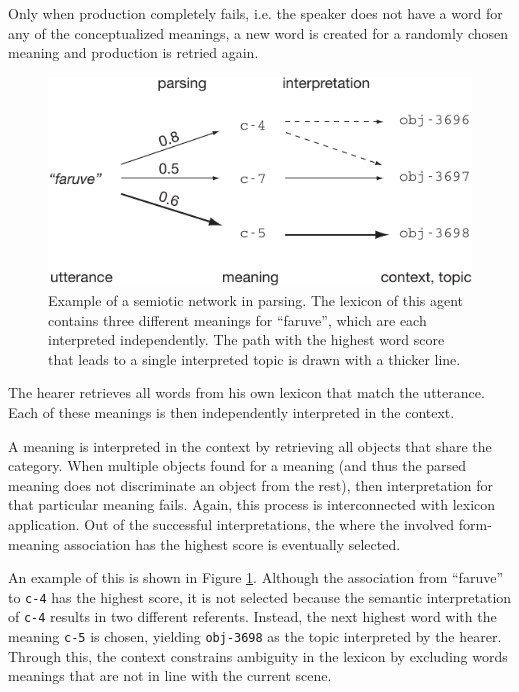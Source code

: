 Only when production completely fails,
i.e. the speaker does not have a word for any of the conceptualized
meanings, a new word is created for a randomly chosen meaning and
production is retried again.

\begin{figure}[t]
  \includegraphics[scale=0.8]{figures/sgg-semiotic-network-parsing}
  \caption{Example of a semiotic network in parsing. The lexicon of
    this agent contains three different meanings for ``faruve'', which
    are each interpreted independently. The path with the highest word
    score that leads to a single interpreted topic is drawn with a
    thicker line. }
  \label{f:sgg-semiotic-network-parsing}
\end{figure}

 The hearer retrieves all words from his own
lexicon that match the utterance. Each of these meanings is then
independently interpreted in the context.

 A meaning
is interpreted in the context by retrieving all objects that share the
category. When multiple objects found for a meaning (and thus the
parsed meaning does not discriminate an object from the rest), then
interpretation for that particular meaning fails. Again, this process
is interconnected with lexicon application. Out of the successful
interpretations, the where the involved form-meaning association has
the highest score is eventually selected. 

An example of this is shown in Figure
\ref{f:sgg-semiotic-network-parsing}. Although the association from
``faruve'' to \texttt{c-4} has the highest score, it is not selected
because the semantic interpretation of \texttt{c-4} results in two
different referents. Instead, the next highest word with the meaning
\texttt{c-5} is chosen, yielding \texttt{obj-3698} as the topic
interpreted by the hearer. Through this, the context constrains
ambiguity in the lexicon by excluding words meanings that are not in
line with the current scene.

